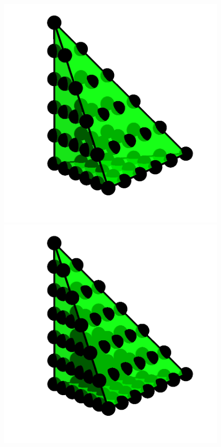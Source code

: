 \begin{figure}
{   \includegraphics[width=\threefigsfull]{chapters/kirby-6/png/CG5_3d.png}
   \includegraphics[width=\threefigsfull]{chapters/kirby-6/png/CG6_3d.png}}
\end{figure}


